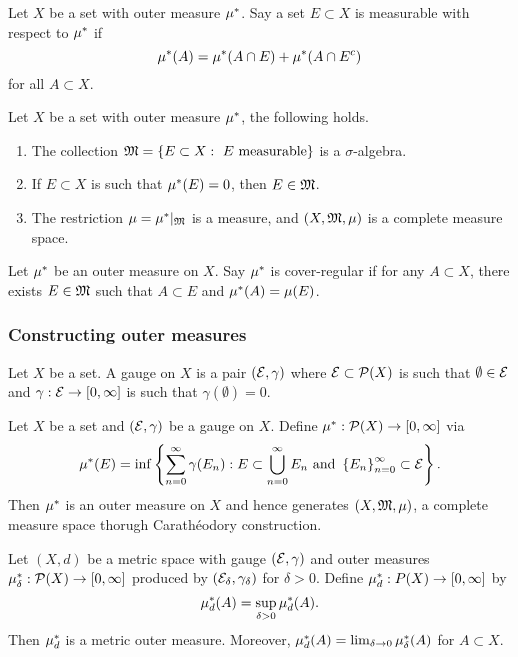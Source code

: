 \documentclass[a4paper]{article}
\begin{document}
\begin{defi}
  Let $X$ be a set with outer measure $\mu^*$. Say 
  a set $E \subset X$ is measurable with respect to 
  $\mu^*$ if 
  \[
  \mu^*(A) = \mu^*(A \cap E) + \mu^*(A \cap E^c) 
  \]
  for all $A \subset X$.
\end{defi}

\begin{thm}
  Let $X$ be a set with outer measure $\mu^*$, the following 
  holds. 
  \begin{enumerate}
    \item The collection $\mathfrak{M} = \left\{ E \subset X: \text{ 
      $E$ measurable} \right\}$ 
      is a $\sigma$-algebra.
    \item If $E \subset X$ is such that $\mu^*(E) = 0$, then 
    $E \in \mathfrak{M}$.
    \item The restriction $\mu = \mu^* \vert_{\mathfrak{M}}$ is a measure, 
    and $(X, \mathfrak{M}, \mu)$ is a complete measure space.
  \end{enumerate}
\end{thm}

\begin{defi}
  Let $\mu^*$ be an outer measure on $X$. Say $\mu^*$
  is cover-regular if for any $A \subset X$, there 
  exists $E \in \mathfrak{M}$ such that $A \subset E$ 
  and $\mu^*(A) = \mu(E)$.
\end{defi}

\subsubsection{Constructing outer measures}

\begin{defi}
  Let $X$ be a set. A gauge on $X$ is a pair $(\mathcal{E}, \gamma)$
  where $\mathcal{E} \subset \mathcal{P}(X)$ is such that $\emptyset 
  \in \mathcal{E}$ and $\gamma : \mathcal{E} \to [0, \infty]$ 
  is such that $\gamma(\emptyset) = 0$.
\end{defi}

\begin{thm}
  Let $X$ be a set and $(\mathcal{E}, \gamma)$ be a gauge on $X$.
  Define $\mu^*: \mathcal{P}(X) \to [0, \infty]$ via 
  \[
  \mu^*(E) = \inf \left\{ \sum_{n=0}^\infty \gamma(E_n): 
  E \subset \bigcup_{n=0}^\infty E_n \text{ and } 
  \left\{ E_n \right\}_{n=0}^\infty \subset \mathcal{E} \right\}.
  \]
  Then $\mu^*$ is an outer measure on $X$ and hence 
  generates $(X, \mathfrak{M}, \mu)$, a complete measure space 
  thorugh Carath\'eodory construction.
\end{thm}

\begin{thm}
  Let $(X, d)$ be a metric space with gauge $(\mathcal{E}, \gamma)$
  and outer measures $\mu^*_\delta: \mathcal{P}(X) \to [0, \infty]$
  produced by $(\mathcal{E}_\delta, \gamma_\delta)$ for $\delta > 0$.
  Define $\mu^*_d : P(X) \to [0, \infty]$ by 
  \[
  \mu^*_d(A) = \sup_{\delta > 0} \mu^*_d (A).
  \]
  Then $\mu^*_d$ is a metric outer measure. Moreover, 
  $\mu^*_d(A) = \lim_{\delta \to 0} \mu^*_\delta(A)$ 
  for $A \subset X$.
\end{thm}
\end{document}
